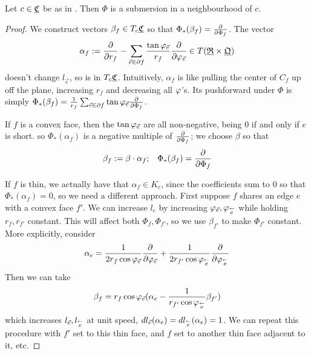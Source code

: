 \begin{lemma}
Let $c \in {\underline{\mathfrak{C}}}$ be as in .
Then $\Phi$ is a submersion in a neighbourhood of $c$.
\end{lemma}

\begin{proof}
We construct vectors $\beta_f \in T_c {\underline{\mathfrak{C}}}$ so that
$\Phi_*(\beta_f) = {\frac{\partial}{\partial \Phi_f}}$.
The vector
\begin{equation}
\label{e:alpha_f}
\alpha_f := {\frac{\partial}{\partial r_f}} - \sum_{\vec{e} \in \partial f} 
	\frac{\tan \varphi_{\vec{e}}}{r_f} {\frac{\partial}{\partial \varphi_{\vec{e}}}}
	\in T({\underline{\mathfrak{R}}} \times {\underline{\mathfrak{Q}}})
\end{equation}
doesn't change $l_{\vec{e}}$,
so is in $T_c {\underline{\mathfrak{C}}}$.
Intuitively, $\alpha_f$ is like
pulling the center of $C_f$ up off the plane, increasing $r_f$ and decreasing all
$\varphi$'s.
Its pushforward under $\Phi$ is simply
$\Phi_*(\beta_f) = \frac{1}{r_f} \sum_{\vec{e}\in \partial f} \tan \varphi_{\vec{e}}
	{\frac{\partial}{\partial \Phi_f}}$.


If $f$ is a convex face, then the $\tan \varphi_{\vec{e}}$ are all non-negative,
being 0 if and only if $e$ is short.
so $\Phi_*(\alpha_f)$ is a negative multiple of ${\frac{\partial}{\partial \Phi_f}}$;
we choose $\beta$ so that
\begin{equation}
\label{e:beta_f_convex}
\beta_f := \beta \cdot \alpha_f; \;\;\;
\Phi_*(\beta_f) = {\frac{\partial}{\partial \Phi_f}}
\end{equation}


If $f$ is thin, we actually have that $\alpha_f \in K_c$,
since the coefficients sum to 0 so that $\Phi_*(\alpha_f) = 0$,
so we need a different approach. First suppose $f$ shares an edge
$e$ with a convex face $f'$. We can increase $l_e$
by increasing $\varphi_{\vec{e}},\varphi_{\overset{\leftarrow}{e}}$
while holding $r_f,r_{f'}$ constant.
This will affect both $\Phi_f, \Phi_{f'}$,
so we use $\beta_{f'}$ to make $\Phi_{f'}$ constant.
More explicitly, consider
\begin{equation}
\label{e:alpha_e}
\alpha_e = \frac{1}{2 r_f \cos \varphi_{\vec{e}}} {\frac{\partial}{\partial \varphi_{\vec{e}}}}
+ \frac{1}{2 r_{f'}\cos \varphi_{\overset{\leftarrow}{e}}} {\frac{\partial}{\partial \varphi_{\overset{\leftarrow}{e}}}}
\end{equation}
Then we can take
\begin{equation}
\label{e:beta_f_thin}
\beta_f = r_f \cos \varphi_{\vec{e}}
	(\alpha_e - \frac{1}{r_{f'} \cos \varphi_{\overset{\leftarrow}{e}}} \beta_{f'})
\end{equation}
which increases $l_{\vec{e}}, l_{\overset{\leftarrow}{e}}$ at unit speed,
$dl_{\vec{e}}(\alpha_e) = dl_{\overset{\leftarrow}{e}}(\alpha_e) = 1$.
We can repeat this procedure with $f'$ set to this thin face,
and $f$ set to another thin face adjacent to it, etc.
\end{proof}

